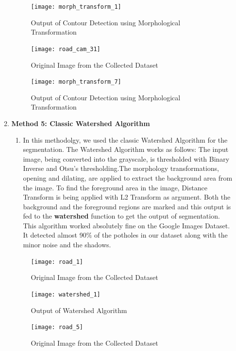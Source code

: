 \begin{enumerate}
\begin{enumerate}
    \begin{figure}[ht!]
        \centering
        \texttt{[image: morph\_transform\_1]}
        \caption{Output of Contour Detection using Morphological Transformation}
    \end{figure}
    \pagebreak
    
    \begin{figure}[ht!]
        \centering
        \texttt{[image: road\_cam\_31]}
        \caption{Original Image from the Collected Dataset}
    \end{figure}

    \begin{figure}[ht!]
        \centering
        \texttt{[image: morph\_transform\_7]}
        \caption{Output of Contour Detection using Morphological Transformation}
    \end{figure}
    \pagebreak
    
    \item \textbf{Method 5: Classic Watershed Algorithm}
    \begin{enumerate}
        \item In this methodolgy, we used the classic Watershed Algorithm for the segmentation. The Watershed Algorithm works as follows: The input image, being converted into the grayscale, is thresholded with Binary Inverse and Otsu's thresholding.The morphology transformations, opening and dilating, are applied to extract the background area from the image. To find the foreground area in the image, Distance Transform is being applied with L2 Transform as argument. Both the background and the foreground regions are marked and this output is fed to the \textbf{watershed} function to get the output of segmentation. This algorithm worked absolutely fine on the Google Images Dataset. It detected almost 90$\%$ of the potholes in our dataset along with the minor noise and the shadows.
    \end{enumerate}
    \begin{figure}[ht!]
        \centering
        \texttt{[image: road\_1]}
        \caption{Original Image from the Collected Dataset}
    \end{figure}

    \begin{figure}[ht!]
        \centering
        \texttt{[image: watershed\_1]}
        \caption{Output of Watershed Algorithm}
    \end{figure}
    \pagebreak
    
    \begin{figure}[ht!]
        \centering
        \texttt{[image: road\_5]}
        \caption{Original Image from the Collected Dataset}
    \end{figure}


\end{enumerate}
\end{enumerate}
